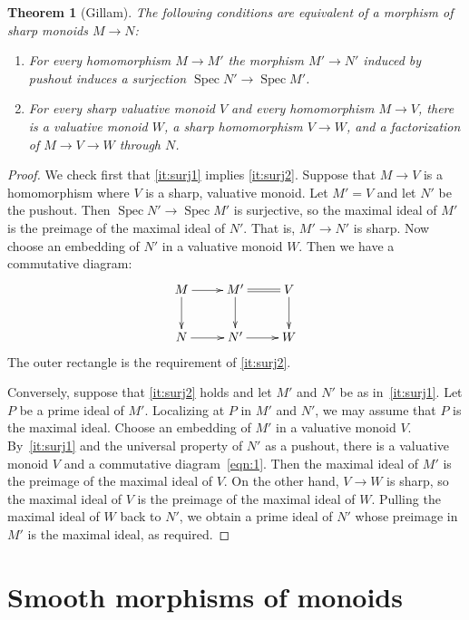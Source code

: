 \documentclass[12pt]{amsart}
\theoremstyle{plan}
\newtheorem{theorem}{Theorem}
\numberwithin{lemma}{theorem}
\numberwithin{corollary}{theorem}
\theoremstyle{definition}
\theoremstyle{remark}
\def\Spec{\operatorname{Spec}}
\begin{document}
\begin{theorem}[Gillam]
The following conditions are equivalent of a morphism of sharp monoids $M \to N$:
\begin{enumerate}[label=(\roman{*})]
\item \label{it:surj1} For every homomorphism $M \to M'$ the morphism $M' \to N'$ induced by pushout induces a surjection $\Spec N' \to \Spec M'$.
\item \label{it:surj2} For every sharp valuative monoid $V$ and every homomorphism $M \to V$, there is a valuative monoid $W$, a sharp homomorphism $V \to W$, and a factorization of $M \to V \to W$ through $N$.
\end{enumerate}
\end{theorem}
\begin{proof}
We check first that \ref{it:surj1} implies \ref{it:surj2}.  Suppose that $M \to V$ is a homomorphism where $V$ is a sharp, valuative monoid.  Let $M' = V$ and let $N'$ be the pushout.  Then $\Spec N' \to \Spec M'$ is surjective, so the maximal ideal of $M'$ is the preimage of the maximal ideal of $N'$.  That is, $M' \to N'$ is sharp.  Now choose an embedding of $N'$ in a valuative monoid $W$.  Then we have a commutative diagram:
\begin{equation} \label{eqn:1} \vcenter{\xymatrix{
M \ar[r] \ar[d] & M' \ar@{=}[r] \ar[d] & V \ar[d] \\
N \ar[r] & N' \ar[r] & W
}}\end{equation}
The outer rectangle is the requirement of \ref{it:surj2}.

Conversely, suppose that \ref{it:surj2} holds and let $M'$ and $N'$ be as in~\ref{it:surj1}.  Let $P$ be a prime ideal of $M'$.  Localizing at $P$ in $M'$ and $N'$, we may assume that $P$ is the maximal ideal.  Choose an embedding of $M'$ in a valuative monoid $V$.  By~\ref{it:surj1} and the universal property of $N'$ as a pushout, there is a valuative monoid $V$ and a commutative diagram~\eqref{eqn:1}.  Then the maximal ideal of $M'$ is the preimage of the maximal ideal of $V$.  On the other hand, $V \to W$ is sharp, so the maximal ideal of $V$ is the preimage of the maximal ideal of $W$.  Pulling the maximal ideal of $W$ back to $N'$, we obtain a prime ideal of $N'$ whose preimage in $M'$ is the maximal ideal, as required.
\end{proof}



\section{Smooth morphisms of monoids}
\end{document}
